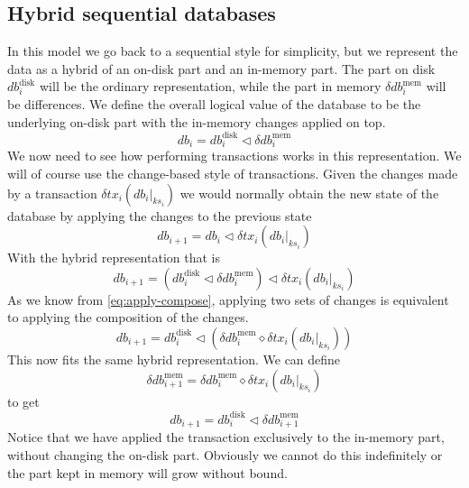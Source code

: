 \documentclass[11pt,a4paper]{article}
\newcommand\restrict[2]{\left.#1\right|_{#2}}
\begin{document}
\subsection{Hybrid sequential databases}

In this model we go back to a sequential style for simplicity, but we represent
the data as a hybrid of an on-disk part and an in-memory part. The part on disk
$\mathit{db}^{\mathrm{disk}}_i$ will be the ordinary representation, while the
part in memory $\delta\mathit{db}^{\mathrm{mem}}_i$ will be differences. We
define the  overall logical value of the database to be the underlying on-disk
part with the in-memory changes applied on top.
\[
\mathit{db}_i = \mathit{db}^{\mathrm{disk}}_i \triangleleft \delta\mathit{db}^{\mathrm{mem}}_i
\]
We now need to see how performing transactions works in this representation. We
will of course use the change-based style of transactions. Given the changes
made by a transaction $\delta\mathit{tx}_i(\restrict{\mathit{db}_i}{\mathit{ks}_i})$
we would normally obtain the new state of the database by applying the changes
to the previous state
\[
\mathit{db}_{i+1} = \mathit{db}_i \triangleleft \delta\mathit{tx}_i(\restrict{\mathit{db}_i}{\mathit{ks}_i})
\]
With the hybrid representation that is
\[
\mathit{db}_{i+1} = \left( \mathit{db}^{\mathrm{disk}}_i \triangleleft \delta\mathit{db}^{\mathrm{mem}}_i \right)
      \triangleleft \delta\mathit{tx}_i(\restrict{\mathit{db}_i}{\mathit{ks}_i})
\]
As we know from \cref{eq:apply-compose}, applying two sets of changes is
equivalent to applying the composition of the changes.
\[
\mathit{db}_{i+1} = \mathit{db}^{\mathrm{disk}}_i
      \triangleleft \left( \delta\mathit{db}^{\mathrm{mem}}_i
                  \diamond \delta\mathit{tx}_i(\restrict{\mathit{db}_i}{\mathit{ks}_i})
                    \right)
\]
This now fits the same hybrid representation. We can define
\[
\delta\mathit{db}^{\mathrm{mem}}_{i+1} = \delta\mathit{db}^{\mathrm{mem}}_i
                  \diamond \delta\mathit{tx}_i(\restrict{\mathit{db}_i}{\mathit{ks}_i})
\]
to get
\[
\mathit{db}_{i+1} = \mathit{db}^{\mathrm{disk}}_i
      \triangleleft \delta\mathit{db}^{\mathrm{mem}}_{i+1}
\]
Notice that we have applied the transaction exclusively to the in-memory part,
without changing the on-disk part. Obviously we cannot do this indefinitely or
the part kept in memory will grow without bound.
\end{document}
